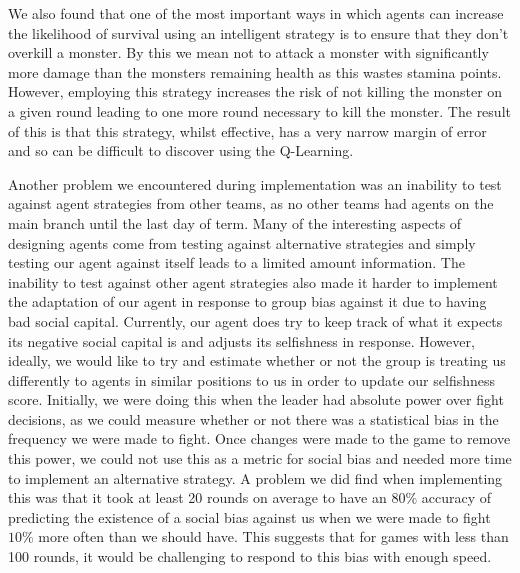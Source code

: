 We also found that one of the most important ways in which agents can increase the likelihood of survival using an intelligent strategy is to ensure that they don't overkill a monster. By this we mean not to attack a monster with significantly more damage than the monsters remaining health as this wastes stamina points. However, employing this strategy increases the risk of not killing the monster on a given round leading to one more round necessary to kill the monster. The result of this is that this strategy, whilst effective, has a very narrow margin of error and so can be difficult to discover using the Q-Learning. 

Another problem we encountered during implementation was an inability to test against agent strategies from other teams, as no other teams had agents on the main branch until the last day of term. Many of the interesting aspects of designing agents come from testing against alternative strategies and simply testing our agent against itself leads to a limited amount information. The inability to test against other agent strategies also made it harder to implement the adaptation of our agent in response to group bias against it due to having bad social capital. Currently, our agent does try to keep track of what it expects its negative social capital is and adjusts its selfishness in response. However, ideally, we would like to try and estimate whether or not the group is treating us differently to agents in similar positions to us in order to update our selfishness score. Initially, we were doing this when the leader had absolute power over fight decisions, as we could measure whether or not there was a statistical bias in the frequency we were made to fight. Once changes were made to the game to remove this power, we could not use this as a metric for social bias and needed more time to implement an alternative strategy. A problem we did find when implementing this was that it took at least 20 rounds on average to have an $80\%$ accuracy of predicting the existence of a social bias against us when we were made to fight $10\%$ more often than we should have. This suggests that for games with less than 100 rounds, it would be challenging to respond to this bias with enough speed.


